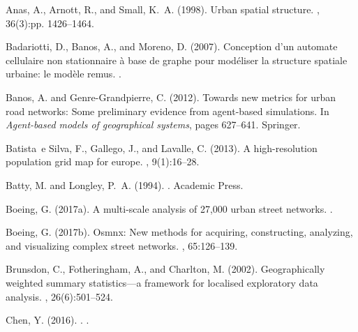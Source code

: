 \documentclass[11pt]{article}
\begin{document}
\begin{thebibliography}{}

Anas, A., Arnott, R., and Small, K.~A. (1998).
\newblock Urban spatial structure.
, 36(3):pp. 1426--1464.

Badariotti, D., Banos, A., and Moreno, D. (2007).
\newblock Conception d'un automate cellulaire non stationnaire {\`a} base de
  graphe pour mod{\'e}liser la structure spatiale urbaine: le mod{\`e}le remus.
.

Banos, A. and Genre-Grandpierre, C. (2012).
\newblock Towards new metrics for urban road networks: Some preliminary
  evidence from agent-based simulations.
\newblock In {\em Agent-based models of geographical systems}, pages 627--641.
  Springer.

Batista~e Silva, F., Gallego, J., and Lavalle, C. (2013).
\newblock A high-resolution population grid map for europe.
, 9(1):16--28.

Batty, M. and Longley, P.~A. (1994).
.
\newblock Academic Press.

Boeing, G. (2017a).
\newblock A multi-scale analysis of 27,000 urban street networks.
.

Boeing, G. (2017b).
\newblock Osmnx: New methods for acquiring, constructing, analyzing, and
  visualizing complex street networks.
, 65:126--139.

Brunsdon, C., Fotheringham, A., and Charlton, M. (2002).
\newblock Geographically weighted summary statistics—a framework for
  localised exploratory data analysis.
, 26(6):501--524.

{Chen}, Y. (2016).
.
.


\end{thebibliography}
\end{document}
